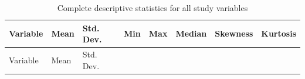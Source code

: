 \documentclass[
  letterpaper,
  oneside,
  openany]{MastersDoctoralThesis}
\begin{document}
\begin{longtable}[]{@{}
  >{\raggedright\arraybackslash}p{}
  >{\raggedright\arraybackslash}p{}
  >{\raggedright\arraybackslash}p{}
  >{\raggedright\arraybackslash}p{}
  >{\raggedright\arraybackslash}p{}
  >{\raggedright\arraybackslash}p{}
  >{\raggedright\arraybackslash}p{}
  >{\raggedright\arraybackslash}p{}@{}}
\caption{Complete descriptive statistics for all study
variables}\label{tbl-app-b-full}\tabularnewline
\toprule\noalign{}
\begin{minipage}[b]{\linewidth}\raggedright
Variable
\end{minipage} & \begin{minipage}[b]{\linewidth}\raggedright
Mean
\end{minipage} & \begin{minipage}[b]{\linewidth}\raggedright
Std. Dev.
\end{minipage} & \begin{minipage}[b]{\linewidth}\raggedright
Min
\end{minipage} & \begin{minipage}[b]{\linewidth}\raggedright
Max
\end{minipage} & \begin{minipage}[b]{\linewidth}\raggedright
Median
\end{minipage} & \begin{minipage}[b]{\linewidth}\raggedright
Skewness
\end{minipage} & \begin{minipage}[b]{\linewidth}\raggedright
Kurtosis
\end{minipage} \\
\midrule\noalign{}
\endfirsthead
\toprule\noalign{}
\begin{minipage}[b]{\linewidth}\raggedright
Variable
\end{minipage} & \begin{minipage}[b]{\linewidth}\raggedright
Mean
\end{minipage} & \begin{minipage}[b]{\linewidth}\raggedright
Std. Dev.
\end{minipage} & \begin{minipage}[b]{\linewidth}\raggedright

\end{minipage}
\end{longtable}
\end{document}
